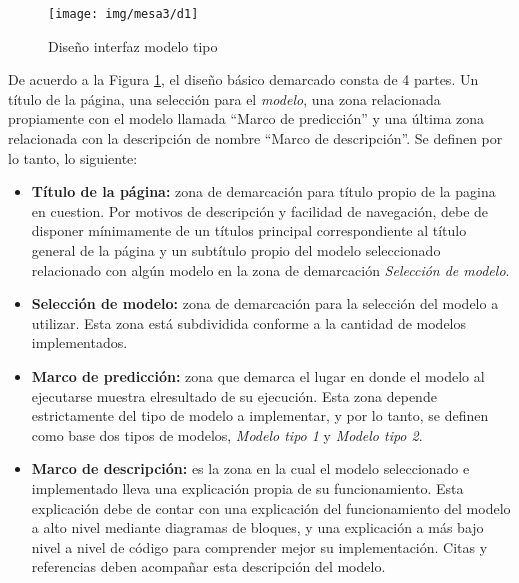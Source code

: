 \begin{figure}[H]
    \texttt{[image: img/mesa3/d1]}
    \centering
    \caption{Diseño interfaz modelo tipo}
    \label{fig:diseno1}
\end{figure}

De acuerdo a la Figura \ref{fig:diseno1}, el diseño básico demarcado consta de 4 partes. Un título de la página, una selección para el \emph{modelo}, una zona relacionada propiamente con el modelo llamada ``Marco de predicción'' y una última zona relacionada con la descripción de nombre ``Marco de descripción''.
Se definen por lo tanto, lo siguiente:
\begin{itemize}
  \item \textbf{Título de la página:}
  zona de demarcación para título propio de la pagina en cuestion.
  Por motivos de descripción y facilidad de navegación,
  debe de disponer
  mínimamente de un títulos principal correspondiente al título general de la página y un subtítulo propio del modelo seleccionado relacionado con algún modelo en la zona de demarcación \emph{Selección de modelo}.\\

  \item \textbf{Selección de modelo:}
  zona de demarcación para la selección del modelo a utilizar.
  Esta zona está subdividida conforme a la cantidad de modelos implementados.\\

  \item \textbf{Marco de predicción:}
  zona que demarca el lugar en donde el modelo al ejecutarse muestra elresultado de su ejecución.
  Esta zona depende estrictamente del tipo de modelo a implementar, y por lo tanto, se definen como base dos tipos de modelos, \emph{Modelo tipo 1} y \emph{Modelo tipo 2}.\\

  \item \textbf{Marco de descripción:}
  es la zona en la cual el modelo seleccionado e implementado
  lleva una explicación propia de su funcionamiento. Esta explicación debe de contar con una explicación del funcionamiento del modelo a alto nivel mediante diagramas de bloques, y una explicación a más bajo nivel a nivel de código para comprender mejor su implementación. Citas y referencias deben acompañar esta descripción del modelo.

\end{itemize}


